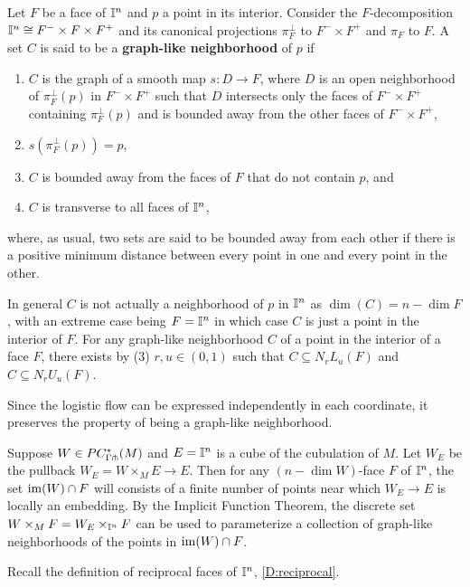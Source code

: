 \begin{definition}\label{D:graph-like}
	Let $F$ be a face of $\mathbb{I}^n$ and $p$ a point in its interior.
	Consider the $F$-decomposition $\mathbb{I}^n \cong F^- \times F \times F^+$ and its canonical projections $\pi_F^{\perp}$ to $F^- \times F^+$ and $\pi_F$ to $F$.
	A set $C$ is said to be a \textbf{graph-like neighborhood} of $p$ if
	\begin{enumerate}
		\item $C$ is the graph of a smooth map $s \colon D \to F$, where $D$ is an open neighborhood of $\pi_F^\perp(p)$ in $F^- \times F^+$ such that $D$ intersects only the faces of $F^- \times F^+$ containing $\pi_F^\perp(p)$ and is bounded away from the other faces of $F^- \times F^+$,
		\item $s(\pi_F^\perp(p)) = p$,
		\item $C$ is bounded away from the faces of $F$ that do not contain $p$, and
		\item $C$ is transverse to all faces of $\mathbb{I}^n$,
	\end{enumerate}
	where, as usual, two sets are said to be bounded away from each other if there is a positive minimum distance between every point in one and every point in the other.
\end{definition}

In general $C$ is not actually a neighborhood of $p$ in $\mathbb{I}^n$ as $\dim(C)=n-\dim F$, with an extreme case being $F =\mathbb{I}^n$ in which case $C$ is just a point in the interior of $F$.
For any graph-like neighborhood $C$ of a point in the interior of a face $F$, there exists by (3) $r, u \in (0,1)$ such that $C \subseteq N_rL_u(F)$ and $C \subseteq N_rU_u(F)$.

Since the logistic flow can be expressed independently in each coordinate, it preserves the property of being a graph-like neighborhood.

Suppose $W \in PC^*_{\Gamma \pitchfork}(M)$ and $E = \mathbb{I}^n$ is a cube of the cubulation of $M$.
Let $W_E$ be the pullback $W_E = W \times_M E \to E$.
Then for any $(n-\dim W)$-face $F$ of $\mathbb{I}^n$, the set $\operatorname{im}(W) \cap F$ will consists of a finite number of points near which $W_E \to E$ is locally an embedding.
By the Implicit Function Theorem, the discrete set $W \times_{M} F = W_E \times_{\mathbb{I}^n} F$ can be used to parameterize a collection of graph-like neighborhoods of the points in $\operatorname{im}(W) \cap F$.


Recall the definition of reciprocal faces of $\mathbb{I}^n$, \cref{D:reciprocal}.

